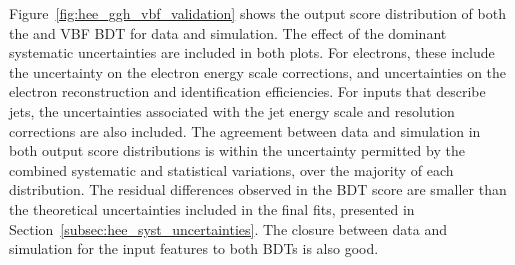 Figure~\ref{fig:hee_ggh_vbf_validation} shows the output score distribution of both the \ggH and VBF BDT for data and simulation. 
The effect of the dominant systematic uncertainties are included in both plots. For electrons, these include the uncertainty on the electron energy scale corrections, and uncertainties on the electron reconstruction and identification efficiencies. For inputs that describe jets, the uncertainties associated with the jet energy scale and resolution corrections are also included. The agreement between data and simulation in both output score distributions is within the uncertainty permitted by the combined systematic and statistical variations, over the majority of each distribution. The residual differences observed in the \ggH BDT score are smaller than the \ggH theoretical uncertainties included in the final fits, presented in Section~\ref{subsec:hee_syst_uncertainties}. The closure between data and simulation for the input features to both BDTs is also good. 

